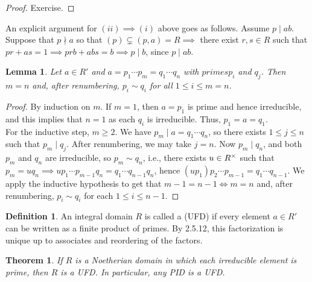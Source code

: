 \documentclass[11pt]{book}
\newcounter{counter}
\newtheorem{theorem}[counter]{Theorem}   \newtheorem*{theorem*}{Theorem}   \newtheorem{lemma}[counter]{Lemma}   \newtheorem{corollary}[counter]{Corollary}
\theoremstyle{definition}   \newtheorem{defn}[counter]{Definition} %
\newcommand{\vs}{\vspace{8pt}}
\numberwithin{counter}{chapter}
\begin{document}
\begin{proof}
Exercise.
\end{proof}

\vs

\begin{remark*}
An explicit argument for $(ii) \implies (i)$ above goes as follows. Assume $p \mid ab$. Suppose that $p \nmid a$ so that $(p) \subsetneq (p,a) = R \implies$ there exist $r,s \in R$ such that $pr + as = 1 \implies prb + abs = b \implies p \mid b$, since $p \mid ab$.
\end{remark*}

\vs

\begin{lemma}
Let $a \in R'$ and $a = p_1 \cdots p_m = q_1 \cdots q_n$ with $primes p_i$ and $q_j$. Then $m = n$ and, after renumbering, $p_i \sim q_i$ for all $1 \leq i \leq m = n$.
\end{lemma}

\begin{proof}
By induction on $m$. If $m = 1$, then $a = p_1$ is prime and hence irreducible, and this implies that $n = 1$ as each $q_i$ is irreducible. Thus, $p_1 = a = q_1$. \\

For the inductive step, $m \geq 2$. We have $p_m \mid a = q_1 \cdots q_n$, so there exists $1 \leq j \leq n$ such that $p_m \mid q_j$. After renumbering, we may take $j = n$. Now $p_m \mid q_n$, and both $p_m$ and $q_n$ are irreducible, so $p_m \sim q_n$, i.e., there exists $u \in R^{\times}$ such that $p_m = u q_n \implies u p_1 \cdots p_{m-1} q_n = q_1 \cdots q_{n-1} q_n$, hence $(up_1) p_2 \cdots p_{m-1} = q_1 \cdots q_{n-1}$. We apply the inductive hypothesis to get that $m-1 = n-1 \iff m = n$ and, after renumbering, $p_i \sim q_i$ for each $1 \leq i \leq n-1$.
\end{proof}

\vs

\begin{defn}
An integral domain $R$ is called a  (UFD) if every element $a \in R'$ can be written as a finite product of primes. By 2.5.12, this factorization is unique up to associates and reordering of the factors.
\end{defn}

\vs

\begin{theorem}
If $R$ is a Noetherian domain in which each irreducible element is prime, then $R$ is a UFD. In particular, any PID is a UFD.
\end{theorem}
\end{document}
